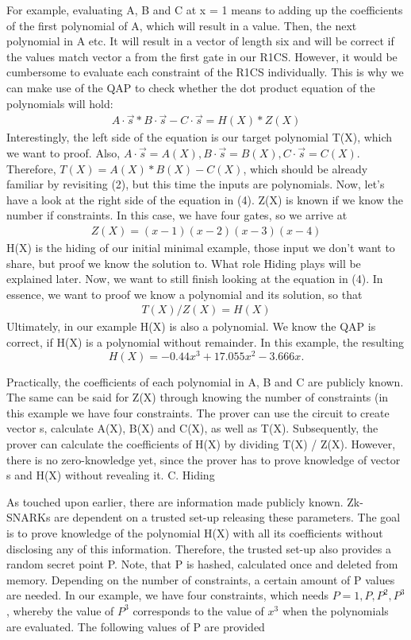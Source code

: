 For example, evaluating A, B and C at x = 1 means to adding up the coefficients of the first polynomial of A, which will result in a value. Then, the next polynomial in A etc. It will result in a vector of length six and will be correct if the values match vector a from the first gate in our R1CS.
However, it would be cumbersome to evaluate each constraint of the R1CS individually. This is why we can make use of the QAP to check whether the dot product equation of the polynomials will hold:
\begin{align}
    A\cdot \Vec{s} * B\cdot \Vec{s} - C\cdot \Vec{s} = H(X) * Z(X)
\end{align}
Interestingly, the left side of the equation is our target polynomial T(X), which we want to proof. Also, \(A \cdot \Vec{s} = A(X), B \cdot \Vec{s} = B(X),  C \cdot \Vec{s} = C(X).\) 
Therefore, \(T(X) = A(X) * B(X) - C(X)\), which should be already familiar by revisiting (2), but this time the inputs are polynomials.
Now, let's have a look at the right side of the equation in (4). Z(X) is known if we know the number if constraints. In this case, we have four gates, so we arrive at
\begin{align}
    Z(X) = (x-1)(x-2)(x-3)(x-4)
\end{align}
H(X) is the hiding of our initial minimal example, those input we don't want to share, but proof we know the solution to. What role Hiding plays will be explained later. Now, we want to still finish looking at the equation in (4). In essence, we want to proof we know a polynomial and its solution, so that
\begin{align}
    T(X) / Z(X) = H(X)
\end{align}
Ultimately, in our example H(X) is also a polynomial. We know the QAP is correct, if H(X) is a polynomial without remainder. In this example, the resulting
\[H(X) = -0.44x^3 + 17.055x^2 - 3.666x.\]

Practically, the coefficients of each polynomial in A, B and C are publicly known. The same can be said for Z(X) through knowing the number of constraints (in this example we have four constraints. The prover can use the circuit to create vector s, calculate A(X), B(X) and C(X), as well as T(X). Subsequently, the prover can calculate the coefficients of H(X) by dividing T(X) / Z(X). However, there is no zero-knowledge yet, since the prover has to prove knowledge of vector s and H(X) without revealing it.
\newpage
C. Hiding

As touched upon earlier, there are information made publicly known. Zk-SNARKs are dependent on a trusted set-up releasing these parameters. The goal is to prove knowledge of the polynomial H(X) with all its coefficients without disclosing any of this information. Therefore, the trusted set-up also provides a random secret point P. Note, that P is hashed, calculated once and deleted from memory. Depending on the number of constraints, a certain amount of P values are needed. In our example, we have four constraints, which needs \(P = {1, P, P^2, P^3}\), whereby the value of \(P^3\) corresponds to the value of \(x^3\) when the polynomials are evaluated. The following values of P are provided

